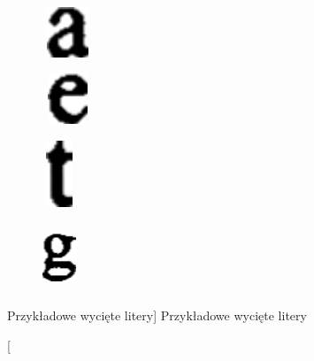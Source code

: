 \documentclass[a4paper,12pt]{article}
\begin{document}
            \begin{figure}[h!]
                \centering
                \begin{subfigure}[b]{2cm}
                    \includegraphics[width=1.5cm, height=1.5cm, frame]{image//exampleImage//letter_01.png}
                    \caption{}
                \end{subfigure}
                \begin{subfigure}[b]{2cm}
                    \includegraphics[width=1.5cm, height=1.5cm, frame]{image//exampleImage//letter_02.png}
                \caption{}
                \end{subfigure}
                \newline
                \begin{subfigure}[b]{2cm}
                    \includegraphics[width=1cm, height=2cm, frame]{image//exampleImage//letter_03.png}
                    \caption{}
                \end{subfigure}
                \begin{subfigure}[b]{2cm}
                    \includegraphics[width=1cm, height=2cm, frame]{image//exampleImage//letter_04.png}
                    \caption{}
                \end{subfigure}
                \caption
                [Przykładowe wycięte litery]
                {Przykładowe wycięte litery}
            \end{figure}
\end{document}
